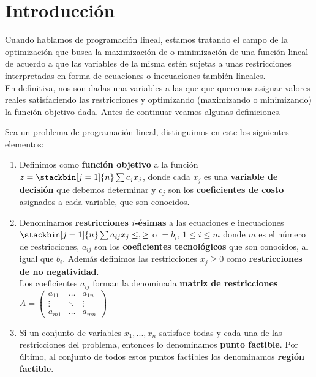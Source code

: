 \section{Introducción}
Cuando hablamos de programación lineal, estamos tratando el campo de la optimización que busca la maximización de o minimización de una función lineal de acuerdo a que las variables de la misma estén sujetas a unas restricciones interpretadas en forma de ecuaciones o inecuaciones también lineales.\\

En definitiva, nos son dadas una variables a las que que queremos asignar valores reales satisfaciendo las restricciones y optimizando (maximizando o minimizando) la función objetivo dada. Antes de continuar veamos algunas definiciones.

\begin{defi} Sea un problema de programación lineal, distinguimos en este los siguientes elementos:
\begin{enumerate}[1)]
\item Definimos como \textbf{función objetivo} a la función $z=\stackbin[j=1]{n}\sum c_jx_j$, donde cada $x_j$ es una \textbf{variable de decisión} que debemos determinar y $c_j$ son los \textbf{coeficientes de costo} asignados a cada variable, que son conocidos.
\item Denominamos \textbf{restricciones $i$-ésimas} a las ecuaciones e inecuaciones\\
$\stackbin[j=1]{n}\sum a_{ij}x_j\leq,\geq$ o $=b_i$, $1\leq i\leq m$ donde $m$ es el número de restricciones, $a_{ij}$ son los \textbf{coeficientes tecnológicos} que son conocidos, al igual que $b_i$. Además definimos las restricciones $x_j \geq 0$ como \textbf{restricciones de no negatividad}.\\
Los coeficientes $a_{ij}$ forman la denominada \textbf{matriz de restricciones} $A=\begin{pmatrix}
a_{11}&\hdots&a_{1n}\\ \vdots&\ddots&\vdots\\a_{m1}&\hdots&a_{mn}\end{pmatrix}$
\item Si un conjunto de variables $x_1,...,x_n$ satisface todas y cada una de las restricciones del problema, entonces lo denominamos \textbf{punto factible}. Por último, al conjunto de todos estos puntos factibles los denominamos \textbf{región factible}.
\end{enumerate}
\end{defi}